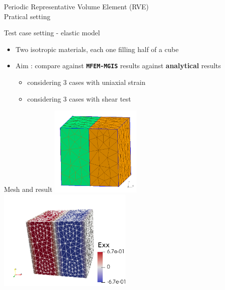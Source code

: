 \documentclass{beamer}
\begin{document}
\begin{frame}{Periodic
    Representative Volume Element (RVE)\\\hspace*{1cm}
    Pratical setting}
  \begin{block}{Test
      case setting - elastic model}
    \protect\hypertarget{test-case-setting---elastic-model}{}
    \begin{itemize}
      \item Two isotropic materials, each one filling half of
      a cube
      \item Aim : compare against \textbf{\texttt{MFEM-MGIS}}
      results against \textbf{analytical} results
      \begin{itemize}
        \item considering 3 cases with uniaxial strain
        \item considering 3 cases with shear test
      \end{itemize}
    \end{itemize}
  \end{block}
  \begin{block}{Mesh
      and result} \vspace*{-5mm}
    \includegraphics[width=0.33\textwidth]{img/cube_2mat.png}
    \includegraphics[width=0.49\textwidth]{img/cube_2mat_exx.png}
    \vspace*{-1mm}
  \end{block}
\end{frame}
\end{document}
